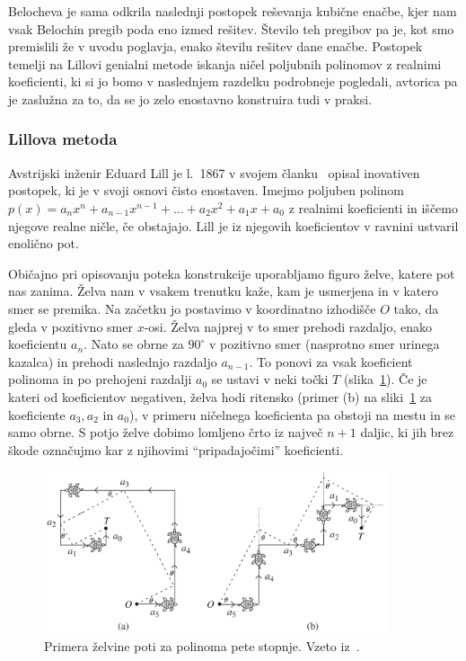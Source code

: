 Belocheva je sama odkrila naslednji postopek reševanja kubične enačbe, kjer nam vsak Belochin pregib poda eno izmed rešitev. Število teh pregibov pa je, kot smo premislili že v uvodu poglavja, enako številu rešitev dane enačbe. Postopek temelji na Lillovi genialni metode iskanja ničel poljubnih polinomov z realnimi koeficienti, ki si jo bomo v naslednjem razdelku podrobneje pogledali, avtorica pa je zaslužna za to, da se jo zelo enostavno konstruira tudi v praksi.

\subsubsection*{Lillova metoda}

Avstrijski inženir Eduard Lill je l.\ 1867 v svojem članku~\cite{lill1867} opisal inovativen postopek, ki je v svoji osnovi čisto enostaven. Imejmo poljuben polinom $ p(x) = a_n x^n + a_{n-1} x^{n-1} + \ldots + a_2 x^2 + a_1 x + a_0 $ z realnimi koeficienti in iščemo njegove realne ničle, če obstajajo. Lill je iz njegovih koeficientov v ravnini ustvaril enolično pot. 

Običajno pri opisovanju poteka konstrukcije uporabljamo figuro želve, katere pot nas zanima. Želva nam v vsakem trenutku kaže, kam je usmerjena in v katero smer se premika. Na začetku jo postavimo v koordinatno izhodišče $O$ tako, da gleda v pozitivno smer $x$-osi. Želva najprej v to smer prehodi razdaljo, enako koeficientu $a_n$. Nato se obrne za $90^\circ$ v pozitivno smer (nasprotno smer urinega kazalca) in prehodi naslednjo razdaljo $a_{n-1}$. To ponovi za vsak koeficient polinoma in po prehojeni razdalji $a_0$ se ustavi v neki točki $T$ (slika~\ref{fig:primera_zelve}). Če je kateri od koeficientov negativen, želva hodi ritensko (primer (b) na sliki~\ref{fig:primera_zelve} za koeficiente $a_3, a_2$ in $a_0$), v primeru ničelnega koeficienta pa obstoji na mestu in se samo obrne. S potjo želve dobimo lomljeno črto iz največ $n+1$ daljic, ki jih brez škode označujmo kar z njihovimi ``pripadajočimi'' koeficienti.

\begin{figure}[h]
    \centering
    \includegraphics[width=0.9\textwidth]{images/kubična enačba/primera_zelvine_poti.png}
    \caption[Primera želvine poti]{Primera želvine poti za polinoma pete stopnje. Vzeto iz~\cite[str.\ 311]{hull2011}.}
    \label{fig:primera_zelve}
\end{figure}

